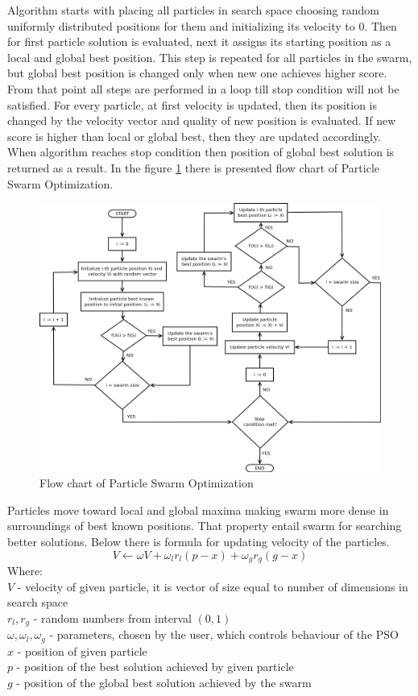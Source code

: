 Algorithm starts with placing all particles in search space choosing random uniformly distributed positions for them and initializing its velocity to 0. 
Then for first particle solution is evaluated, next it assigns its starting position as a local and global best position. 
This step is repeated for all particles in the swarm, but global best position is changed only when new one achieves higher score. 
From that point all steps are performed in a loop till stop condition will not be satisfied. For every particle, at first 
velocity is updated, then its position is changed by the velocity vector and quality of new position is evaluated. 
If new score is higher than local or global best, then they are updated accordingly. When algorithm reaches stop condition 
then position of global best solution is returned as a result.
In the figure \ref{pso_flowchart} there is presented flow chart of Particle Swarm Optimization.
\begin{figure}[ht]
    \centering
    \includegraphics[scale=0.4]{img/pso_flowchart.png}
    \caption{Flow chart of Particle Swarm Optimization}
    \label{pso_flowchart}
\end{figure}

Particles move toward local and global maxima making swarm more dense in surroundings of best known positions. 
That property entail swarm for searching better solutions.
Below there is formula for updating velocity of the particles.
\[ 
    V \gets \omega V + \omega _{l} r _{l} (p - x) + \omega _{g} r _{g} (g - x)
\]
Where: \\
\(V\)  - velocity of given particle, it is vector of size equal to number of dimensions in search space \\
\(r _{l}, r _{g}\) - random numbers from interval \((0,1)\) \\
\(\omega, \omega _{l}, \omega _{g}\) - parameters, chosen by the user, which controls behaviour of the PSO \\
\(x\)  - position of given particle \\
\(p\)  - position of the best solution achieved by given particle \\
\(g\)  - position of the global best solution achieved by the swarm \\

